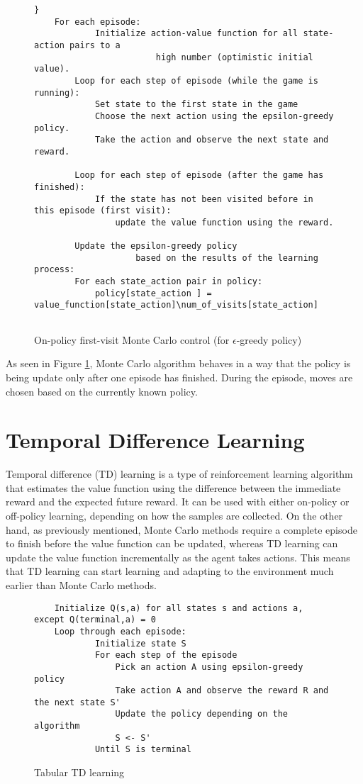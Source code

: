 \begin{figure}[h]
    \centering
    \begin{verbatim}}
    For each episode:
    		Initialize action-value function for all state-action pairs to a 
    					high number (optimistic initial value).
		Loop for each step of episode (while the game is running):
			Set state to the first state in the game
			Choose the next action using the epsilon-greedy policy.
			Take the action and observe the next state and reward.
			
		Loop for each step of episode (after the game has finished):
			If the state has not been visited before in this episode (first visit):
				update the value function using the reward.
				
		Update the epsilon-greedy policy 
					based on the results of the learning process:
		For each state_action pair in policy:
			policy[state_action ] = value_function[state_action]\num_of_visits[state_action]
		
	\end{verbatim}	
    \caption{On-policy first-visit Monte Carlo control (for $\epsilon$-greedy policy)}
    \label{algo:MC} 
\end{figure}

As seen in Figure \ref{algo:MC}, Monte Carlo algorithm behaves in a way that the policy is being update only after one episode has finished. During the episode, moves are chosen based on the currently known policy. 

\section{Temporal Difference Learning}
Temporal difference (TD) learning is a type of reinforcement learning algorithm that estimates the value function using the difference between the immediate reward and the expected future reward. It can be used with either on-policy or off-policy learning, depending on how the samples are collected.
On the other hand, as previously mentioned, Monte Carlo methods require a complete episode to finish before the value function can be updated, whereas TD learning can update the value function incrementally as the agent takes actions. This means that TD learning can start learning and adapting to the environment much earlier than Monte Carlo methods.

\begin{figure}[h]
    \centering
    \begin{verbatim}
    Initialize Q(s,a) for all states s and actions a, except Q(terminal,a) = 0
    Loop through each episode:
    		Initialize state S
    		For each step of the episode
    			Pick an action A using epsilon-greedy policy
    			Take action A and observe the reward R and the next state S' 
    			Update the policy depending on the algorithm
    			S <- S'
    		Until S is terminal
	\end{verbatim}
    \caption{Tabular TD learning}
    \label{algo:TD}
\end{figure}

